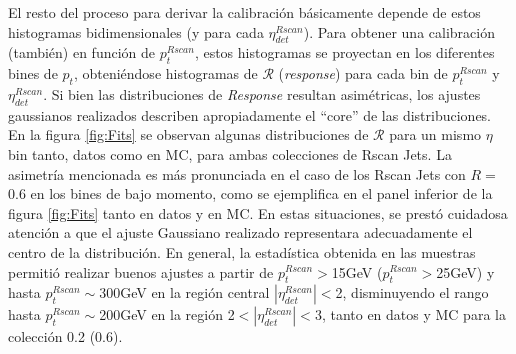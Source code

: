El resto del proceso para derivar la calibración básicamente depende de estos histogramas bidimensionales (y para cada $\eta^{Rscan}_{det}$). Para obtener una calibración (también) en función de $p_t^{Rscan}$, estos histogramas se proyectan en los diferentes bines de $p_t$, obteniéndose histogramas de $\mathcal{R}$ (\textit{response}) para cada bin de $p_t^{Rscan}$ y $\eta_{det}^{Rscan}$. Si bien las distribuciones de \textit{Response} resultan asimétricas, los ajustes gaussianos realizados describen apropiadamente el ``core'' de las distribuciones. En la figura \ref{fig:Fits} se observan algunas distribuciones de $\mathcal{R}$ para un mismo $\eta$ bin tanto, datos como en MC, para ambas colecciones de Rscan Jets. La asimetría mencionada es más pronunciada en el caso de los Rscan Jets con $R=$0.6 en los bines de bajo momento, como se ejemplifica en el panel inferior de la figura \ref{fig:Fits} tanto en datos y en MC. En estas situaciones, se prestó cuidadosa atención a que el ajuste Gaussiano realizado representara adecuadamente el centro de la distribución. En general, la estadística obtenida en las muestras permitió realizar buenos ajustes a partir de $p_t^{Rscan}>$15GeV ($p_t^{Rscan}>$25GeV) y hasta $p_t^{Rscan}\sim$300GeV en la región central $|\eta_{det}^{Rscan}|<$2, disminuyendo el rango hasta $p_t^{Rscan}\sim$200GeV en la región 2$<|\eta_{det}^{Rscan}|<$3, tanto en datos y MC para la colección 0.2 (0.6).  


